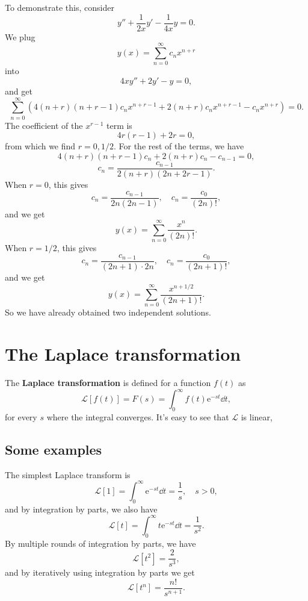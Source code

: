 \documentclass[hyperref, a4paper]{article}
\newcommand*{\ee}{\mathrm{e}}
\newcommand*{\concept}[1]{{\textbf{#1}}}
\newcommand*{\laplace}{\mathcal{L}}
\begin{document}
To demonstrate this, 
consider 
\begin{equation}
    y'' + \frac{1}{2x} y' - \frac{1}{4x} y = 0.
\end{equation}
We plug 
\[
    y(x) = \sum_{n=0}^\infty c_n x^{n + r}
\]
into 
\[
    4 x y'' + 2 y' - y = 0,
\]
and get 
\[
    \sum_{n=0}^\infty \left(
        4 (n + r) (n + r - 1) c_n x^{n + r - 1}
        + 2 (n + r) c_n x^{n + r - 1} 
        - c_n x^{n + r}
    \right) = 0.
\]
The coefficient of the $x^{r-1}$ term is 
\[
    4 r (r - 1) + 2 r = 0,
\]
from which we find $r = 0, 1/2$.
For the rest of the terms, we have 
\[
    4 (n + r) (n + r - 1) c_n
    + 2 (n + r) c_n
    - c_{n-1} = 0,
\]
\[
    c_n = \frac{c_{n-1}}{2 (n + r) (2 n + 2 r - 1)}.
\]
When $r = 0$, this gives 
\[
    c_n = \frac{c_{n-1}}{2n (2n - 1)} , \quad 
    c_n = \frac{c_0}{(2n)!},
\]
and we get 
\begin{equation}
    y(x) = \sum_{n=0}^\infty \frac{x^n}{(2n)!}.
\end{equation}
When $r = 1/2$, this gives 
\[
    c_n = \frac{c_{n-1}}{(2n + 1) \cdot 2n}, \quad 
    c_n = \frac{c_0}{(2 n + 1)!},
\]
and we get 
\begin{equation}
    y(x) = \sum_{n=0}^\infty \frac{x^{n + 1/2}}{(2 n + 1)!}.
\end{equation}
So we have already obtained two independent solutions. 

\section{The Laplace transformation}

The \concept{Laplace transformation} is defined for a function $f(t)$ as 
\begin{equation}
    \mathcal{L}[f(t)] = F(s) = \int_{0}^{\infty} f(t) \ee^{-st} \dd{t},
\end{equation}
for every $s$ where the integral converges. 
It's easy to see that $\mathcal{L}$ is linear, 

\subsection{Some examples}

The simplest Laplace transform is 
\begin{equation}
    \mathcal{L}[1] = \int_{0}^{\infty} \ee^{-st} \dd{t} = \frac{1}{s},
    \quad s > 0,
\end{equation}
and by integration by parts, we also have 
\begin{equation}
    \laplace[t] = \int_{0}^{\infty} t \ee^{-st} \dd{t}
    = \frac{1}{s^2}.
\end{equation}
By multiple rounds of integration by parts, we have 
\begin{equation}
    \laplace[t^2] = \frac{2}{s^3},
\end{equation}
and by iteratively using integration by parts we get 
\begin{equation}
    \laplace [t^n] = \frac{n!}{s^{n+1}}.
\end{equation}
\end{document}
